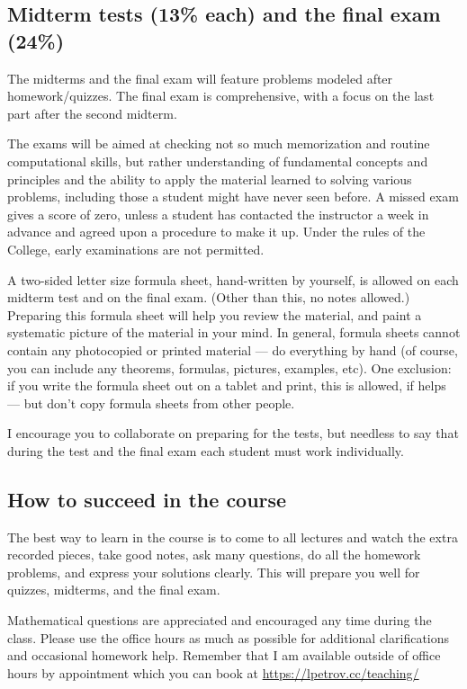 \documentclass[oneside,11pt]{amsart}
\begin{document}
\subsection{Midterm tests (13\% each) and the final exam (24\%)}

The midterms and the final exam will feature
problems modeled after homework/quizzes.
The final exam is comprehensive, with a focus on the last part
after the second midterm.

The exams will be aimed at checking not so much memorization and
routine computational skills, but rather understanding of fundamental
concepts and principles and the ability to apply the material
learned to solving various problems, including those a student might
have never seen before. A missed exam gives a score of zero, unless a
student has contacted the instructor a week in advance and agreed upon a
procedure to make it up. Under the rules of
the College, early examinations are not permitted.

\medskip

A two-sided letter size formula sheet, hand-written by yourself, is
allowed on each midterm test and on the final exam.
(Other than this, no notes allowed.)
Preparing this formula sheet
will help you review the material, and paint a systematic picture of the material in your mind.
In general, formula sheets cannot contain any photocopied or
printed material --- do everything by hand (of course, you can
include any theorems, formulas, pictures, examples, etc).
One exclusion: if you write the formula sheet out on a
tablet and print, this is allowed, if helps --- but don't copy
formula sheets from other people.

I encourage you to collaborate on preparing for the tests, but needless to say that
during the test and the final exam each student must work individually.

\subsection*{How to succeed in the course}

The best way to learn in the course is to come to all lectures and watch the extra recorded pieces, take good notes,
ask many questions,
do all the homework problems, and express your solutions
clearly.
This will prepare you well for quizzes, midterms, and the final exam.

Mathematical questions are appreciated and encouraged any time during the
class. Please use the office hours as much as possible for additional
clarifications and occasional homework help. Remember that I am available outside 
of office hours by appointment which you can book at
\url{https://lpetrov.cc/teaching/}
\end{document}
